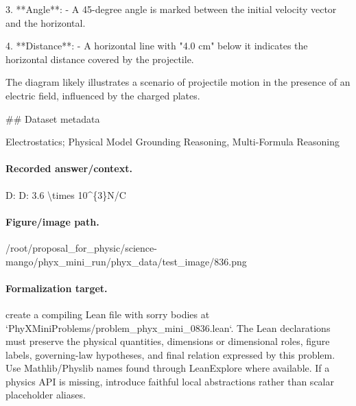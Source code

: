 3. **Angle**:
   - A 45-degree angle is marked between the initial velocity vector and the horizontal.

4. **Distance**:
   - A horizontal line with "4.0 cm" below it indicates the horizontal distance covered by the projectile.

The diagram likely illustrates a scenario of projectile motion in the presence of an electric field, influenced by the charged plates.

\#\# Dataset metadata

Electrostatics; Physical Model Grounding Reasoning, Multi-Formula Reasoning

\paragraph{Recorded answer/context.}
D: D: 3.6 \textbackslash{}times 10\textasciicircum{}\{3\}N/C

\paragraph{Figure/image path.}
/root/proposal\_for\_physic/science-mango/phyx\_mini\_run/phyx\_data/test\_image/836.png

\paragraph{Formalization target.}
create a compiling Lean file with sorry bodies at `PhyXMiniProblems/problem\_phyx\_mini\_0836.lean`. The Lean declarations must preserve the physical quantities, dimensions or dimensional roles, figure labels, governing-law hypotheses, and final relation expressed by this problem.
Use Mathlib/Physlib names found through LeanExplore where available. If a physics API is missing, introduce faithful local abstractions rather than scalar placeholder aliases.

